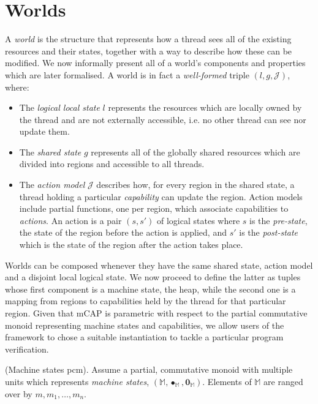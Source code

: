 \section{Worlds} \label{worlds}

A \textit{world} is the structure that represents how a thread sees all of the existing resources and their states, together with a way to describe how these can be modified. We now informally present all of a world's components and properties which are later formalised. A world is in fact a \textit{well-formed} triple $(l, g, \mathcal{J})$, where:
\begin{itemize}
	\item The \textit{logical local state} $l$ represents the resources which are locally owned by the thread and are not externally accessible, i.e. no other thread can see nor update them.
	\item The \textit{shared state} $g$ represents all of the globally shared resources which are divided into regions and accessible to all threads.
	\item The \textit{action model} $\mathcal{J}$ describes how, for every region in the shared state, a thread holding a particular \textit{capability} can update the region. Action models include partial functions, one per region, which associate capabilities to \textit{actions}. An action is a pair $(s, s')$ of logical states where $s$ is the \textit{pre-state}, the state of the region before the action is applied, and $s'$ is the \textit{post-state} which is the state of the region after the action takes place.
\end{itemize}

Worlds can be composed whenever they have the same shared state, action model and a disjoint local logical state. We now proceed to define the latter as tuples whose first component is a machine state, the heap, while the second one is a mapping from regions to capabilities held by the thread for that particular region. Given that mCAP is parametric with respect to the partial commutative monoid representing machine states and capabilities, we allow users of the framework to chose a suitable instantiation to tackle a particular program verification.

\begin{param}
	\label{param:machineStates}
	(Machine states pcm).
	Assume a partial, commutative monoid with multiple units which represents \emph{machine states}, $(\mathbb{M}, \bullet_\mathbb{M}, \mathbf{0}_\mathbb{M})$. Elements of $\mathbb{M}$ are ranged over by $m, m_1, \ldots, m_n$.
\end{param}


